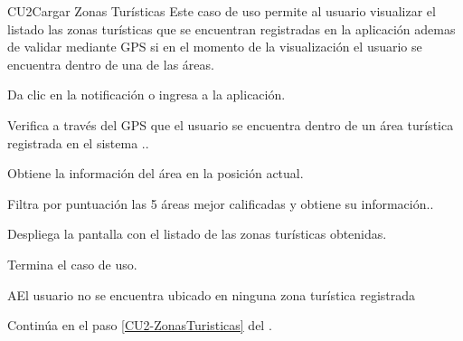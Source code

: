 
% 



	\begin{UseCase}{CU2}{Cargar Zonas Turísticas}{
		Este caso de uso permite al usuario visualizar el listado las zonas turísticas que se encuentran registradas en la aplicación ademas de validar mediante GPS si en el momento de la visualización el usuario se encuentra dentro de una de las áreas. 
	}
	\end{UseCase}
	\begin{UCtrayectoria} 
		\UCpaso[\UCactor] Da clic en la notificación o ingresa a la aplicación.
		
		\UCpaso Verifica a través del GPS que el usuario se encuentra dentro de un área turística registrada en el sistema ..
		
		\UCpaso Obtiene la información del área en la posición actual.
		
		\UCpaso Filtra por puntuación las 5 áreas mejor calificadas y obtiene su información.\label{CU2-ZonasTuristicas}.
		
		\UCpaso Despliega la pantalla  con el listado de las zonas turísticas obtenidas.

		\UCpaso[] Termina el caso de uso.
		
	\end{UCtrayectoria}

		\begin{UCtrayectoriaA}{A}{El usuario no se encuentra ubicado en ninguna zona turística registrada}
			
			\UCpaso Continúa en el paso \ref{CU2-ZonasTuristicas} del .
			
		\end{UCtrayectoriaA}
	
	